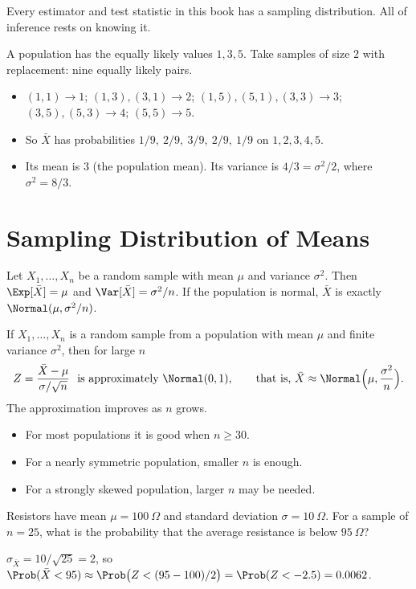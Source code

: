 Every estimator and test statistic in this book has a sampling distribution. All of inference rests on knowing it.

\begin{example}
A population has the equally likely values $1,3,5$. Take samples of size $2$ with replacement: nine equally likely pairs.
\begin{itemize}
  \item $(1,1)\to1$; $(1,3),(3,1)\to2$; $(1,5),(5,1),(3,3)\to3$; $(3,5),(5,3)\to4$; $(5,5)\to5$.
  \item So $\bar{X}$ has probabilities $1/9,\ 2/9,\ 3/9,\ 2/9,\ 1/9$ on $1,2,3,4,5$.
  \item Its mean is $3$ (the population mean). Its variance is $4/3=\sigma^2/2$, where $\sigma^2=8/3$.
\end{itemize}
\end{example}

\section{Sampling Distribution of Means}\label{sec:sampmeans}

\begin{theorem}\label{thm:dist-xbar}
Let $X_1,\dots,X_n$ be a random sample with mean $\mu$ and variance $\sigma^2$. Then $\Exp[\bar{X}]=\mu$ and $\Var[\bar{X}]=\sigma^2/n$. If the population is normal, $\bar{X}$ is exactly $\Normal(\mu,\sigma^2/n)$.
\end{theorem}

\begin{theorem}\label{thm:clt-text}
If $X_1,\dots,X_n$ is a random sample from a population with mean $\mu$ and finite variance $\sigma^2$, then for large $n$
\[ Z=\frac{\bar{X}-\mu}{\sigma/\sqrt n}\ \text{ is approximately }\Normal(0,1),\qquad\text{that is, }\bar{X}\approx\Normal\Big(\mu,\frac{\sigma^2}n\Big). \]
The approximation improves as $n$ grows.
\begin{itemize}
  \item For most populations it is good when $n\ge30$.
  \item For a nearly symmetric population, smaller $n$ is enough.
  \item For a strongly skewed population, larger $n$ may be needed.
\end{itemize}
\end{theorem}

\begin{example}
Resistors have mean $\mu=100\ \Omega$ and standard deviation $\sigma=10\ \Omega$. For a sample of $n=25$, what is the probability that the average resistance is below $95\ \Omega$?

$\sigma_{\bar{X}}=10/\sqrt{25}=2$, so $\Prob(\bar{X}<95)\approx\Prob\big(Z<(95-100)/2\big)=\Prob(Z<-2.5)=0.0062$.
\end{example}

